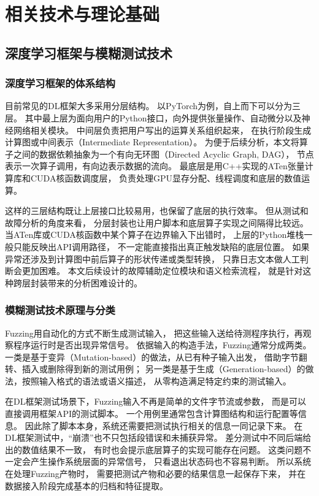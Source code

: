 \chapter{相关技术与理论基础}

\section{深度学习框架与模糊测试技术}

\subsection{深度学习框架的体系结构}

目前常见的DL框架大多采用分层结构\cite{ref_pytorch_arch}。
以PyTorch为例，自上而下可以分为三层。
其中最上层为面向用户的Python接口，向外提供张量操作、自动微分以及神经网络相关模块。
中间层负责把用户写出的运算关系组织起来，
在执行阶段生成计算图或中间表示（Intermediate Representation）。
为便于后续分析，本文将算子之间的数据依赖抽象为一个有向无环图（Directed Acyclic Graph, DAG），
节点表示一次算子调用，有向边表示数据的流向。
最底层是用C++实现的ATen张量计算库和CUDA核函数调度层，
负责处理GPU显存分配、线程调度和底层的数值运算。

这样的三层结构既让上层接口比较易用，也保留了底层的执行效率。
但从测试和故障分析的角度来看，
分层封装也让用户脚本和底层算子实现之间隔得比较远。
当ATen库或CUDA核函数中某个算子在边界输入下出错时，
上层的Python堆栈一般只能反映出API调用路径，
不一定能直接指出真正触发缺陷的底层位置。
如果异常还涉及到计算图中前后算子的形状传递或类型转换，
只靠日志文本做人工判断会更加困难。
本文后续设计的故障辅助定位模块和语义检索流程，
就是针对这种跨层封装带来的分析困难设计的。

\subsection{模糊测试技术原理与分类}

Fuzzing用自动化的方式不断生成测试输入，
把这些输入送给待测程序执行，再观察程序运行时是否出现异常信号\cite{ref_fuzzing_art}。
依据输入的构造手法，Fuzzing通常分成两类。
一类是基于变异（Mutation-based）的做法，从已有种子输入出发，
借助字节翻转、插入或删除得到新的测试用例\cite{ref_afl}；
另一类是基于生成（Generation-based）的做法，按照输入格式的语法或语义描述，
从零构造满足特定约束的测试输入\cite{ref_grammar_fuzzing}。

在DL框架测试场景下，Fuzzing输入不再是简单的文件字节流或参数，
而是可以直接调用框架API的测试脚本。
一个用例里通常包含计算图结构和运行配置等信息。
因此除了脚本本身，系统还需要把测试执行相关的信息一同记录下来。
在DL框架测试中，“崩溃”也不只包括段错误和未捕获异常。
差分测试中不同后端给出的数值结果不一致，
有时也会提示底层算子的实现可能存在问题\cite{ref_differential_testing}。
这类问题不一定会产生操作系统层面的异常信号，
只看退出状态码也不容易判断。
所以系统在处理Fuzzing产物时，
需要把测试产物和必要的结果信息一起保存下来，
并在数据接入阶段完成基本的归档和特征提取。

